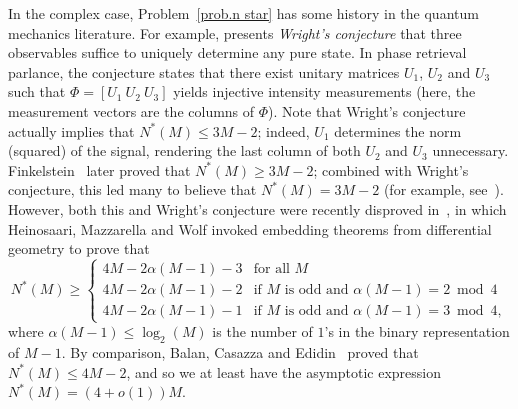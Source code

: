 \documentclass[times,10pt]{elsarticle}
\theoremstyle{plain}
\begin{document}
In the complex case, Problem~\ref{prob.n star} has some history in the quantum mechanics literature.
For example, \cite{Vogt:78} presents \textit{Wright's conjecture} that three observables suffice to uniquely determine any pure state.
In phase retrieval parlance, the conjecture states that there exist unitary matrices $U_1$, $U_2$ and $U_3$ such that $\Phi=[U_1~U_2~U_3]$ yields injective intensity measurements (here, the measurement vectors are the columns of $\Phi$).
Note that Wright's conjecture actually implies that $N^*(M)\leq 3M-2$; indeed, $U_1$ determines the norm (squared) of the signal, rendering the last column of both $U_2$ and $U_3$ unnecessary.
Finkelstein~\cite{Finkelstein:04} later proved that $N^*(M)\geq 3M-2$; combined with Wright's conjecture, this led many to believe that $N^*(M)=3M-2$ (for example, see~\cite{CandesESV:11}).
However, both this and Wright's conjecture were recently disproved in~\cite{HeinosaariMW:11}, in which Heinosaari, Mazzarella and Wolf invoked embedding theorems from differential geometry to prove that 
\begin{equation}
\label{eq.HMW lower bound}
N^*(M)\geq
\left\{
\begin{array}{ll}
4M-2\alpha(M-1)-3 &\mbox{for all } M\\
4M-2\alpha(M-1)-2 &\mbox{if } M\mbox{ is odd and }\alpha(M-1)=2\bmod 4\\
4M-2\alpha(M-1)-1 &\mbox{if } M\mbox{ is odd and }\alpha(M-1)=3\bmod 4,
\end{array}
\right.
\end{equation}
where $\alpha(M-1)\leq\log_2(M)$ is the number of $1$'s in the binary representation of $M-1$.
By comparison, Balan, Casazza and Edidin~\cite{BalanCE:06} proved that $N^*(M)\leq4M-2$, and so we at least have the asymptotic expression $N^*(M)=(4+o(1))M$.
\end{document}
